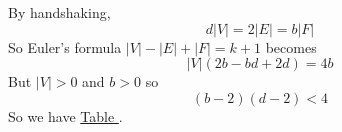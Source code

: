 \noindent{}
{By handshaking,
\begin{equation}\label{eq:thm:15.3.5.1a}
    d|V| = 2|E| = b|F|
\end{equation}
So Euler's formula \(|V| - |E| + |F| = k+1\) becomes
\begin{equation}\label{eq:thm:15.3.5.1b}
    |V|(2b-bd+2d) = 4b
\end{equation}
But \(|V| > 0\) and \(b > 0\) so
\begin{equation}\label{eq:thm:15.3.5.1c}
    (b-2)(d-2) < 4
\end{equation}
So we have \hyperref[tab:Platonic Graphs]{Table \thetable}.}